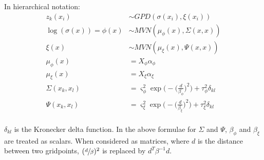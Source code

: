 \documentclass{article}
\begin{document}
In hierarchical notation:
\begin{align*}
z_k(x_i) &\sim GPD(\sigma(x_i), \xi(x_i)) \\
\log (\sigma (x)) = \phi(x) &\sim MVN(\mu_\phi(x), \Sigma(x, x)) \\
\xi (x) &\sim MVN(\mu_\xi(x), \Psi(x, x) )\\
\mu_\phi(x) &= X_\phi \alpha_\phi \\
\mu_\xi(x) &= X_\xi \alpha_\xi \\
\Sigma(x_k, x_l) &= \varsigma_\phi^2 \exp \bigg(-\Big(\frac{d}{\beta_\phi}\Big)^2\bigg)  + \tau_\phi^2 \delta_{kl} \\
\Psi(x_k, x_l) &= \varsigma_\xi^2 \exp \bigg(-\Big(\frac{d}{\beta_\xi}\Big)^2\bigg) + \tau_\xi^2 \delta_{kl} \\
\end{align*}

$\delta_{kl}$ is the Kronecker delta function. In the above formulae for $\Sigma$ and $\Psi$, $\beta_\phi$ and $\beta_\xi$ are treated as scalars. When considered as matrices, where $d$ is the distance between two gridpoints, $(\sfrac{d}{\beta})^2$ is replaced by $d^T \beta^{-1} d$.
\\
\end{document}
